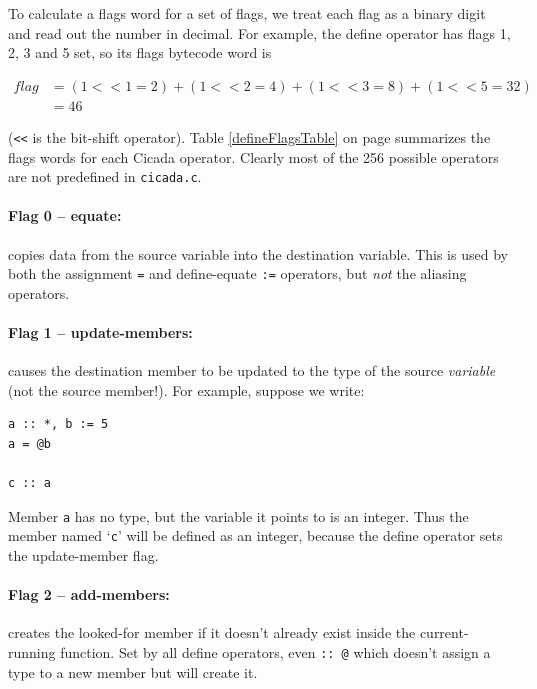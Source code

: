 \documentclass{article}
\newenvironment{code}{
       \begin{list}{}{
               \setlength{\leftmargin}{.4in}
               \setlength{\rightmargin}{0in}
               \setlength{\topsep}{.2in}
       }
       \small
       \item[] }
       { \end{list}   }
\begin{document}
To calculate a flags word for a set of flags, we treat each flag as a binary digit and read out the number in decimal.  For example, the define operator has flags 1, 2, 3 and 5 set, so its flags bytecode word is

\begin{align*}
flag &= (1 << 1 = 2) + (1 << 2 = 4) + (1 << 3 = 8) + (1 << 5 = 32)\\
&= 46
\end{align*}

\noindent (\verb#<<# is the bit-shift operator).  Table \ref{defineFlagsTable} on page \pageref{defineFlagsTable} summarizes the flags words for each Cicada operator.  Clearly most of the 256 possible operators are not predefined in \verb#cicada.c#.\\


\paragraph{Flag 0 -- equate:}  copies data from the source variable into the destination variable.  This is used by both the assignment \verb#=# and define-equate \verb#:=# operators, but \emph{not} the aliasing operators.\\


\paragraph{Flag 1 -- update-members:}  causes the destination member to be updated to the type of the source \emph{variable} (not the source member!).  For example, suppose we write:

\begin{code} \begin{verbatim}
a :: *, b := 5
a = @b

c :: a
\end{verbatim} \end{code}

\noindent Member \verb#a# has no type, but the variable it points to is an integer.  Thus the member named `\verb#c#' will be defined as an integer, because the define operator sets the update-member flag.\\


\paragraph{Flag 2 -- add-members:}  creates the looked-for member if it doesn't already exist inside the current-running function.  Set by all define operators, even \verb#:: @# which doesn't assign a type to a new member but will create it.\\
\end{document}
